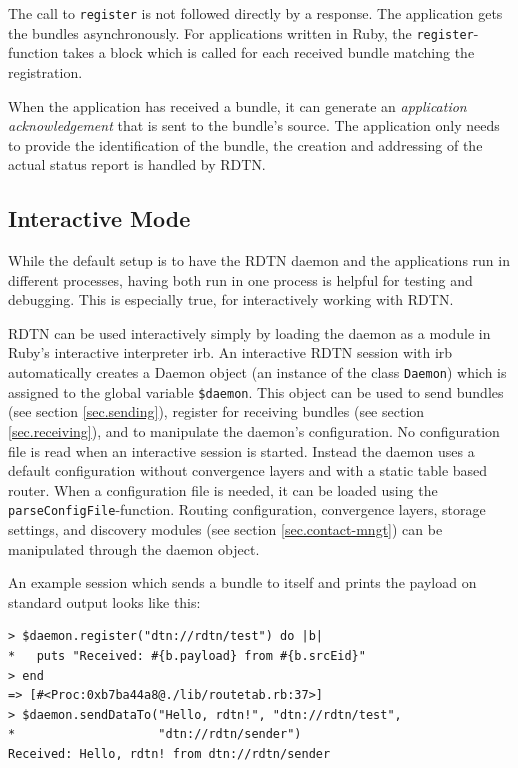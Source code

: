 \documentclass[a4paper]{article}
\begin{document}
The call to {\tt register} is not followed directly by a response. The
application gets the bundles asynchronously. For applications written in Ruby,
the {\tt register}-function takes a block which is called for each received
bundle matching the registration.

When the application has received a bundle, it can generate an {\em application
acknowledgement} that is sent to the bundle's source. The application only needs
to provide the identification of the bundle, the creation and addressing of the
actual status report is handled by RDTN.

\subsection{Interactive Mode}\label{sec.interactive}

While the default setup is to have the RDTN daemon and the applications run in
different processes, having both run in one process is helpful for testing and
debugging. This is especially true, for interactively working with
RDTN. 

RDTN can be used interactively simply by loading the daemon as a module in
Ruby's interactive interpreter irb.
An interactive RDTN session with irb automatically creates a Daemon object (an
instance of the class {\tt Daemon}) which is assigned to the global
variable {\tt \$daemon}. This object can be used to send bundles (see section
\ref{sec.sending}), register for receiving bundles (see section
\ref{sec.receiving}), and to manipulate the daemon's configuration. No
configuration file is read when an interactive session is started. Instead the
daemon uses a default configuration without convergence layers and with a static
table based router. When a configuration file is needed, it can be loaded
using the {\tt parseConfigFile}-function. Routing configuration, convergence
layers, storage settings, and discovery modules (see section
\ref{sec.contact-mngt}) can be manipulated through the daemon object.

An example session which sends a bundle to itself and prints the payload on
standard output looks like this:

\begin{verbatim}
> $daemon.register("dtn://rdtn/test") do |b|
*   puts "Received: #{b.payload} from #{b.srcEid}"
> end
=> [#<Proc:0xb7ba44a8@./lib/routetab.rb:37>]
> $daemon.sendDataTo("Hello, rdtn!", "dtn://rdtn/test",
*                    "dtn://rdtn/sender")
Received: Hello, rdtn! from dtn://rdtn/sender
\end{verbatim}
\end{document}
